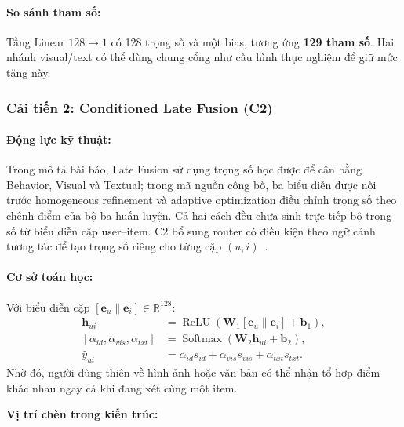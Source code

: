 \paragraph{So sánh tham số:}
Tầng Linear $128\rightarrow1$ có 128 trọng số và một bias, tương ứng \textbf{129 tham số}. Hai nhánh visual/text có thể dùng chung cổng như cấu hình thực nghiệm để giữ mức tăng này.


\subsubsection{Cải tiến 2: Conditioned Late Fusion (C2)}

\paragraph{Động lực kỹ thuật:}
Trong mô tả bài báo, Late Fusion sử dụng trọng số học được để cân bằng Behavior, Visual và Textual; trong mã nguồn công bố, ba biểu diễn được nối trước homogeneous refinement và adaptive optimization điều chỉnh trọng số theo chênh điểm của bộ ba huấn luyện. Cả hai cách đều chưa sinh trực tiếp bộ trọng số từ biểu diễn cặp user--item. C2 bổ sung router có điều kiện theo ngữ cảnh tương tác để tạo trọng số riêng cho từng cặp $(u,i)$~\cite{xu2025cohesion}.

\paragraph{Cơ sở toán học:}
Với biểu diễn cặp $[\mathbf e_u\|\mathbf e_i]\in\mathbb R^{128}$:
\begin{align}
\mathbf h_{ui}&=\operatorname{ReLU}\!\left(
\mathbf W_1[\mathbf e_u\|\mathbf e_i]+\mathbf b_1\right),\\
[\alpha_{id},\alpha_{vis},\alpha_{txt}]&=
\operatorname{Softmax}\!\left(\mathbf W_2\mathbf h_{ui}+\mathbf b_2\right),\\
\hat y_{ui}&=\alpha_{id}s_{id}+\alpha_{vis}s_{vis}+\alpha_{txt}s_{txt}.
\end{align}
Nhờ đó, người dùng thiên về hình ảnh hoặc văn bản có thể nhận tổ hợp điểm khác nhau ngay cả khi đang xét cùng một item.

\par\medskip
\noindent\textbf{Vị trí chèn trong kiến trúc:}\par
\nopagebreak[4]

